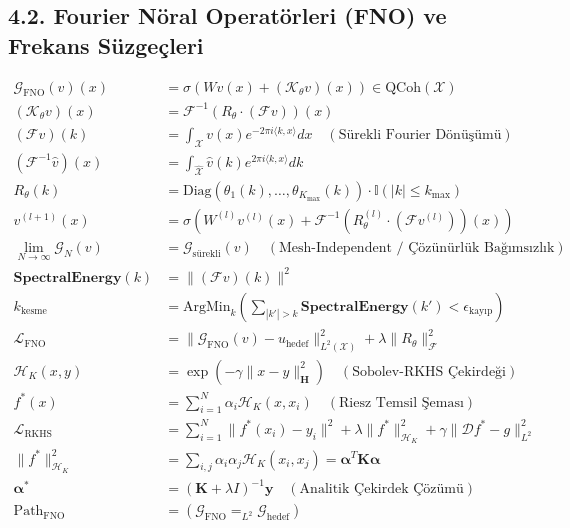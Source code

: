 \documentclass[11pt, a4paper]{article}
\begin{document}
\subsection{4.2. Fourier Nöral Operatörleri (FNO) ve Frekans Süzgeçleri}
\begin{align}
\mathcal{G}_{\text{FNO}}(v)(x) &= \sigma\left( W v(x) + (\mathcal{K}_\theta v)(x) \right) \in \text{QCoh}(\mathcal{X}) \\
(\mathcal{K}_\theta v)(x) &= \mathcal{F}^{-1} \left( R_\theta \cdot (\mathcal{F} v) \right)(x) \\
(\mathcal{F} v)(k) &= \int_{\mathcal{X}} v(x) e^{-2\pi i \langle k, x \rangle} dx \quad (\text{Sürekli Fourier Dönüşümü}) \\
(\mathcal{F}^{-1} \hat{v})(x) &= \int_{\hat{\mathcal{X}}} \hat{v}(k) e^{2\pi i \langle k, x \rangle} dk \\
R_\theta(k) &= \text{Diag}(\theta_1(k), \dots, \theta_{K_{\max}}(k)) \cdot \mathbb{I}(|k| \le k_{\text{max}}) \\
v^{(l+1)}(x) &= \sigma\left( W^{(l)} v^{(l)}(x) + \mathcal{F}^{-1} \left( R_\theta^{(l)} \cdot (\mathcal{F} v^{(l)}) \right)(x) \right) \\
\lim_{N \to \infty} \mathcal{G}_N(v) &= \mathcal{G}_{\text{sürekli}}(v) \quad (\text{Mesh-Independent / Çözünürlük Bağımsızlık}) \\
\mathbf{SpectralEnergy}(k) &= \| (\mathcal{F} v)(k) \|^2 \\
k_{\text{kesme}} &= \text{ArgMin}_k \left( \sum_{|k'|>k} \mathbf{SpectralEnergy}(k') < \epsilon_{\text{kayıp}} \right) \\
\mathcal{L}_{\text{FNO}} &= \| \mathcal{G}_{\text{FNO}}(v) - u_{\text{hedef}} \|_{L^2(\mathcal{X})}^2 + \lambda \| R_\theta \|_{\mathcal{F}}^2 \\
\mathcal{H}_K(x, y) &= \exp\left( -\gamma \|x - y\|_{\mathbf{H}}^2 \right) \quad (\text{Sobolev-RKHS Çekirdeği}) \\
f^*(x) &= \sum_{i=1}^N \alpha_i \mathcal{H}_K(x, x_i) \quad (\text{Riesz Temsil Şeması}) \\
\mathcal{L}_{\text{RKHS}} &= \sum_{i=1}^N \|f^*(x_i) - y_i\|^2 + \lambda \|f^*\|_{\mathcal{H}_K}^2 + \gamma \|\mathcal{D} f^* - g\|_{L^2}^2 \\
\|f^*\|_{\mathcal{H}_K}^2 &= \sum_{i,j} \alpha_i \alpha_j \mathcal{H}_K(x_i, x_j) = \bm{\alpha}^T \mathbf{K} \bm{\alpha} \\
\bm{\alpha}^* &= (\mathbf{K} + \lambda I)^{-1} \mathbf{y} \quad (\text{Analitik Çekirdek Çözümü}) \\
\text{Path}_{\text{FNO}} &= (\mathcal{G}_{\text{FNO}} =_{L^2} \mathcal{G}_{\text{hedef}})
\end{align}
\end{document}
